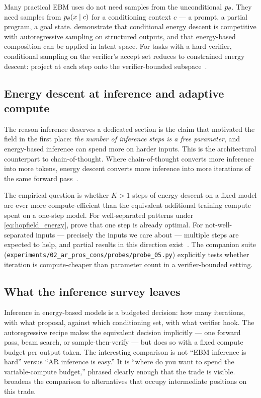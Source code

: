 Many practical EBM uses do not need samples from the unconditional $p_\theta$.
They need samples from $p_\theta(x \mid c)$ for a conditioning context $c$ --- a prompt, a partial program, a goal state.
\citet{du2023reduce} demonstrate that conditional energy descent is competitive with autoregressive sampling on structured outputs, and that energy-based composition can be applied in latent space.
For tasks with a hard verifier, conditional sampling on the verifier's accept set reduces to constrained energy descent: project at each step onto the verifier-bounded subspace~\citep{cobbe2021training}.

\subsection{Energy descent at inference and adaptive compute}
\label{ssec:adaptive_compute}

The reason inference deserves a dedicated section is the claim that motivated the field in the first place: \emph{the number of inference steps is a free parameter}, and energy-based inference can spend more on harder inputs.
This is the architectural counterpart to chain-of-thought.
Where chain-of-thought converts more inference into more tokens, energy descent converts more inference into more iterations of the same forward pass~\citep{lecun2022autonomous,du2023reduce}.

The empirical question is whether $K > 1$ steps of energy descent on a fixed model are ever more compute-efficient than the equivalent additional training compute spent on a one-step model.
For well-separated patterns under \cref{eq:hopfield_energy}, \citet{ramsauer2020hopfield} prove that one step is already optimal.
For not-well-separated inputs --- precisely the inputs we care about --- multiple steps are expected to help, and partial results in this direction exist~\citep{bachlechner2021rezero,bansal2022end,schwarzschild2021can}.
The companion suite (\texttt{experiments/02\_ar\_pros\_cons/probes/probe\_05.py}) explicitly tests whether iteration is compute-cheaper than parameter count in a verifier-bounded setting.

\subsection{What the inference survey leaves}
\label{ssec:inference_leaves}

Inference in energy-based models is a budgeted decision: how many iterations, with what proposal, against which conditioning set, with what verifier hook.
The autoregressive recipe makes the equivalent decision implicitly --- one forward pass, beam search, or sample-then-verify --- but does so with a fixed compute budget per output token.
The interesting comparison is not ``EBM inference is hard'' versus ``AR inference is easy.''
It is ``where do you want to spend the variable-compute budget,'' phrased clearly enough that the trade is visible.
 broadens the comparison to alternatives that occupy intermediate positions on this trade.
